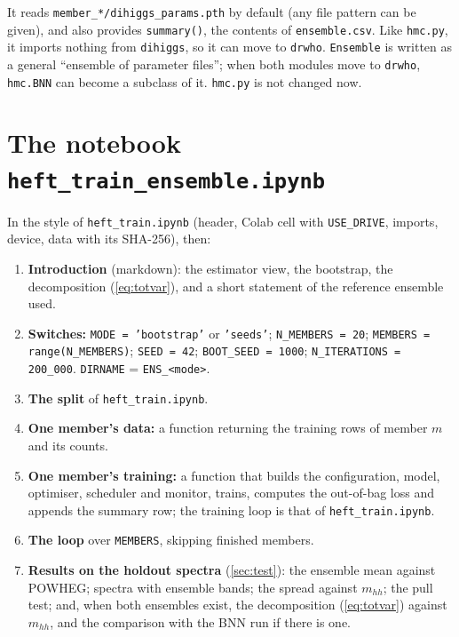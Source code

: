 \documentclass[11pt]{article}
\newcommand{\file}[1]{\nolinkurl{#1}}
\newcommand{\code}[1]{\texttt{#1}}
\newcommand{\mhh}{m_{hh}}
\begin{document}
\noindent It reads \file{member_*/dihiggs_params.pth} by default (any file pattern can be
given), and also provides \code{summary()}, the contents of \file{ensemble.csv}. Like
\file{hmc.py}, it imports nothing from \code{dihiggs}, so it can move to \code{drwho}.
\code{Ensemble} is written as a general ``ensemble of parameter files''; when both modules
move to \code{drwho}, \code{hmc.BNN} can become a subclass of it. \file{hmc.py} is not
changed now.

\section{The notebook \texttt{heft\_train\_ensemble.ipynb}}
\label{sec:notebook}

In the style of \file{heft_train.ipynb} (header, Colab cell with \code{USE\_DRIVE},
imports, device, data with its SHA-256), then:

\begin{enumerate}
  \item \textbf{Introduction} (markdown): the estimator view, the bootstrap, the
    decomposition (\ref{eq:totvar}), and a short statement of the reference ensemble
    used.
  \item \textbf{Switches:} \code{MODE = 'bootstrap'} or \code{'seeds'};
    \code{N\_MEMBERS = 20}; \code{MEMBERS = range(N\_MEMBERS)}; \code{SEED = 42};
    \code{BOOT\_SEED = 1000}; \code{N\_ITERATIONS = 200\_000}.
    \code{DIRNAME} = \file{ENS_<mode>}.
  \item \textbf{The split} of \file{heft_train.ipynb}.
  \item \textbf{One member's data:} a function returning the training rows of member $m$
    and its counts.
  \item \textbf{One member's training:} a function that builds the configuration, model,
    optimiser, scheduler and monitor, trains, computes the out-of-bag loss and appends the
    summary row; the training loop is that of \file{heft_train.ipynb}.
  \item \textbf{The loop} over \code{MEMBERS}, skipping finished members.
  \item \textbf{Results on the holdout spectra} (\cref{sec:test}): the ensemble mean
    against POWHEG; spectra with ensemble bands; the spread against $\mhh$; the pull test;
    and, when both ensembles exist, the decomposition (\ref{eq:totvar}) against $\mhh$, and
    the comparison with the BNN run if there is one.
\end{enumerate}
\end{document}
